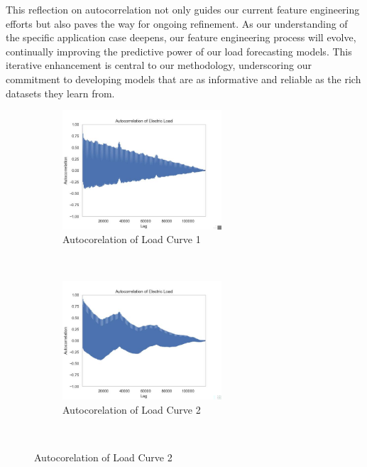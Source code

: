 \documentclass{article} %
\begin{document}
This reflection on autocorrelation not only guides our current feature engineering efforts but also paves the way for ongoing refinement. As our understanding of the specific application case deepens, our feature engineering process will evolve, continually improving the predictive power of our load forecasting models. This iterative enhancement is central to our methodology, underscoring our commitment to developing models that are as informative and reliable as the rich datasets they learn from. 
\begin{figure}[H]
    \centering
    \begin{subfigure}[b]{\textwidth}
        \centering
        \includegraphics[width=0.65\textwidth]{ressources/Autocorrelation/lectricLoad_autocorrelation.jpg}
        \caption{Autocorelation of Load Curve 1}
        \label{fig:autocorrelation1}
    \end{subfigure}
    \\
    \begin{subfigure}[b]{\textwidth}
        \centering
        \includegraphics[width=0.65\textwidth]{ressources/Autocorrelation/lectricLoad_autocorrelation(1).jpg}
        \caption{Autocorelation of Load Curve 2}
        \label{fig:autocorrelation2}
    \end{subfigure}
    \\

\end{figure}
\end{document}
